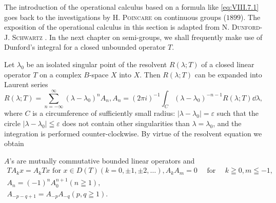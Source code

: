 \begin{remarku} The introduction of the operational calculus based on a formula like \eqref{eq:VIII.7.1} goes back to the investigations by H. \textsc{Poincare} on  
continuous groups ($1899$). The exposition of the operational calculus in this section is adapted from N. \textsc{Dunford}-J. \textsc{Schwartz} \cite{dunford44}. In the next chapter on semi-groups, we shall frequently make use of Dunford's integral for a closed unbounded operator $T$. 
\end{remarku}


\label{sec:VIII.8}

Let $\lambda_{0}$ be an isolated singular point of the resolvent $R(\lambda; T)$ of a closed linear operator $T$ on a complex $B$-space $X$ into $X$. Then $R(\lambda; T)$ can be expanded into Laurent series 
\begin{equation}\label{eq:VIII.8.1}
R (\lambda ; T) = \sum\limits_{n = - \infty} ^{\infty} (\lambda - \lambda_{0}) ^{n} A _{n}, A _{n} = (2 \pi i) ^{-1} \int_{C} (\lambda - \lambda_{0}) ^{-n-1} R (\lambda ; T) \dd \lambda ,
\end{equation}
where $C$ is a circumference of sufficiently small radius: $|\lambda - \lambda_{0}| = \varepsilon$ such that the circle $|\lambda - \lambda_{0}| \leqq \varepsilon$ does not contain other singularities than $\lambda = \lambda_{0}$, and the integration is performed counter-clockwise. By virtue of the resolvent equation we obtain 

\begin{theorem}\label{thm:VIII.8.Theorem.1} $A$'s are mutually commutative bounded linear operators and 
\begin{equation}\label{eq:VIII.8.2}
\begin{gathered}
T A _{k} x = A _{k} T x \text{ for } x \in D (T) (k = 0, \pm 1, \pm 2, \dots), A _{k} A _{m} = 0 \quad \text{ for } \quad k \geqq 0, m \leqq - 1,
\\
A _{n} = (- 1) ^{n} A _{0} ^{n+1} (n \geqq 1),
\\
A _{-p-q+1} = A _{-p} A _{-q} (p, q \geqq 1).
\end{gathered}
\end{equation}
\end{theorem}

